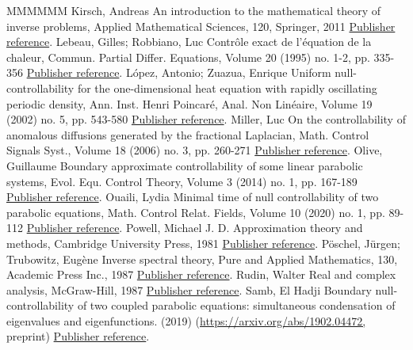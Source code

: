 \documentclass[11pt]{article}
\theoremstyle{definition}
\numberwithin{equation}{section}
\numberwithin{figure}{section}
\numberwithin{table}{section}
\begin{document}
\begin{thebibliography}{MMMMMM}
 Kirsch, Andreas An introduction to the mathematical theory of inverse problems, Applied Mathematical Sciences, 120, Springer, 2011 \href{https://ahl.centre-mersenne.org/item/AHL_2020__3__717_0/#KirschBook}{Publisher reference}.
 Lebeau, Gilles; Robbiano, Luc Contrôle exact de l’équation de la chaleur, Commun. Partial Differ. Equations, Volume 20 (1995) no. 1-2, pp. 335-356 \href{https://ahl.centre-mersenne.org/item/AHL_2020__3__717_0/#LebeauRobbiano95}{Publisher reference}.
 López, Antonio; Zuazua, Enrique Uniform null-controllability for the one-dimensional heat equation with rapidly oscillating periodic density, Ann. Inst. Henri Poincaré, Anal. Non Linéaire, Volume 19 (2002) no. 5, pp. 543-580 \href{https://ahl.centre-mersenne.org/item/AHL_2020__3__717_0/#LopezZuazua:2002}{Publisher reference}.
 Miller, Luc On the controllability of anomalous diffusions generated by the fractional Laplacian, Math. Control Signals Syst., Volume 18 (2006) no. 3, pp. 260-271 \href{https://ahl.centre-mersenne.org/item/AHL_2020__3__717_0/#Miller06}{Publisher reference}.
 Olive, Guillaume Boundary approximate controllability of some linear parabolic systems, Evol. Equ. Control Theory, Volume 3 (2014) no. 1, pp. 167-189 \href{https://ahl.centre-mersenne.org/item/AHL_2020__3__717_0/#Olive13}{Publisher reference}.
 Ouaili, Lydia Minimal time of null controllability of two parabolic equations, Math. Control Relat. Fields, Volume 10 (2020) no. 1, pp. 89-112 \href{https://ahl.centre-mersenne.org/item/AHL_2020__3__717_0/#Ouaili18}{Publisher reference}.
 Powell, Michael J. D. Approximation theory and methods, Cambridge University Press, 1981 \href{https://ahl.centre-mersenne.org/item/AHL_2020__3__717_0/#Powell_1981}{Publisher reference}.
 Pöschel, Jürgen; Trubowitz, Eugène Inverse spectral theory, Pure and Applied Mathematics, 130, Academic Press Inc., 1987 \href{https://ahl.centre-mersenne.org/item/AHL_2020__3__717_0/#PoeschelTrubowitz:1987}{Publisher reference}.
 Rudin, Walter Real and complex analysis, McGraw-Hill, 1987 \href{https://ahl.centre-mersenne.org/item/AHL_2020__3__717_0/#RudinAnalyseComplexe}{Publisher reference}.
 Samb, El Hadji Boundary null-controllability of two coupled parabolic equations: simultaneous condensation of eigenvalues and eigenfunctions. (2019) (\url{https://arxiv.org/abs/1902.04472,} preprint) \href{https://ahl.centre-mersenne.org/item/AHL_2020__3__717_0/#Samb18}{Publisher reference}.

\end{thebibliography}
\end{document}
